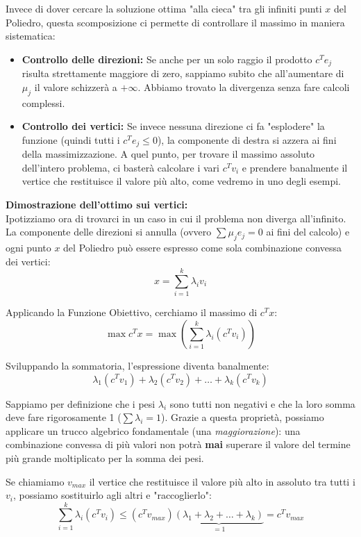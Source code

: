 \documentclass[12pt, a4paper]{article}
\begin{document}
	Invece di dover cercare la soluzione ottima "alla cieca" tra gli infiniti punti $x$ del Poliedro, questa scomposizione ci permette di controllare il massimo in maniera sistematica:
	\begin{itemize}
		\item \textbf{Controllo delle direzioni:} Se anche per un solo raggio il prodotto $c^T e_j$ risulta strettamente maggiore di zero, sappiamo subito che all'aumentare di $\mu_j$ il valore schizzerà a $+\infty$. Abbiamo trovato la divergenza senza fare calcoli complessi.
		\item \textbf{Controllo dei vertici:} Se invece nessuna direzione ci fa "esplodere" la funzione (quindi tutti i $c^T e_j \leq 0$), la componente di destra si azzera ai fini della massimizzazione. A quel punto, per trovare il massimo assoluto dell'intero problema, ci basterà calcolare i vari $c^T v_i$ e prendere banalmente il vertice che restituisce il valore più alto, come vedremo in uno degli esempi.
	\end{itemize}
	
	\vspace{0.4cm}
	\textbf{Dimostrazione dell'ottimo sui vertici:}\\
	Ipotizziamo ora di trovarci in un caso in cui il problema non diverga all'infinito. La componente delle direzioni si annulla (ovvero $\sum \mu_j e_j = 0$ ai fini del calcolo) e ogni punto $x$ del Poliedro può essere espresso come sola combinazione convessa dei vertici:
	\[
	x = \sum_{i=1}^k \lambda_i v_i
	\]
	
	Applicando la Funzione Obiettivo, cerchiamo il massimo di $c^T x$:
	\[
	\max c^T x = \max \left( \sum_{i=1}^k \lambda_i (c^T v_i) \right)
	\]
	
	Sviluppando la sommatoria, l'espressione diventa banalmente:
	\[
	\lambda_1(c^T v_1) + \lambda_2(c^T v_2) + \dots + \lambda_k(c^T v_k)
	\]
	
	Sappiamo per definizione che i pesi $\lambda_i$ sono tutti non negativi e che la loro somma deve fare rigorosamente 1 ($\sum \lambda_i = 1$). Grazie a questa proprietà, possiamo applicare un trucco algebrico fondamentale (una \textit{maggiorazione}): una combinazione convessa di più valori non potrà \textbf{mai} superare il valore del termine più grande moltiplicato per la somma dei pesi. 
	
	Se chiamiamo $v_{max}$ il vertice che restituisce il valore più alto in assoluto tra tutti i $v_i$, possiamo sostituirlo agli altri e "raccoglierlo":
	\[
	\sum_{i=1}^k \lambda_i (c^T v_i) \leq (c^T v_{max}) \underbrace{(\lambda_1 + \lambda_2 + \dots + \lambda_k)}_{= 1} = c^T v_{max}
	\]
	
\end{document}
